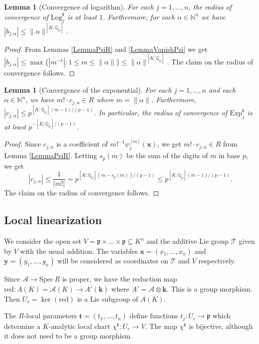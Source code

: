 \documentclass[11pt]{amsart}
\newtheorem{lemma}[theorem]{Lemma}
\theoremstyle{remark}
\numberwithin{equation}{section}
\newcommand{\pfrak}{\mathfrak{p}}
\newcommand{\Acal}{\mathscr{A}}
\newcommand{\Tcal}{\mathscr{T}}
\newcommand{\Q}{\mathbb{Q}}
\newcommand{\N}{\mathbb{N}}
\newcommand{\kk}{\mathbf{k}}
\newcommand{\xx}{\mathbf{x}}
\newcommand{\yy}{\mathbf{y}}
\newcommand{\ttt}{\mathbf{t}}
\newcommand{\Spec}{\mathrm{Spec}\,}
\newcommand{\Exp}{\mathrm{Exp}}
\newcommand{\red}{\mathrm{red}}
\newcommand{\Log}{\mathrm{Log}}
\begin{document}
\begin{lemma}[Convergence of  logarithm]\label{LemmaCvLog} For each $j=1,...,n$, the radius of convergence of $\Log^{\ttt}_j$ is at least $1$. Furthermore, for each $\alpha\in \N^n$ we have $|b_{j,\alpha}|\le \|\alpha\|^{[K:\Q_p]}$.
\end{lemma}
\begin{proof} From Lemmas \ref{LemmaPsiR} and \ref{LemmaVanishPsi} we get $|b_{j,\alpha}|\le \max\{ |m^{-1}|: 1\le m\le\|\alpha\|\} \le \|\alpha\|^{[K:\Q_p]}$. The claim on the radius of convergence follows.
\end{proof}


\begin{lemma}[Convergence of the exponential] \label{LemmaCvExp} For each $j=1,...,n$ and each $\alpha\in \N^n$, we have $m!\cdot c_{j,\alpha}\in R$ where $m=\|\alpha\|$. Furthermore, $|c_{j,\alpha}|\le p^{[K:\Q_p](m-1)/(p-1)}$. In particular, the radius of convergence of $\Exp^{\ttt}_j$ is at least $p^{-[K:\Q_p]/(p-1)}$.
\end{lemma}
\begin{proof} Since $c_{j,\alpha}$ is a coefficient of $m!^{-1} \psi_j^{[m]}(\xx)$, we get $m!\cdot c_{j,\alpha}\in R$ from Lemma \ref{LemmaPsiR}. Letting $s_p(m)$ be the sum of the digits of $m$ in base $p$, we get
$$
|c_{j,\alpha}|\le \frac{1}{|m!|} =p^{[K:\Q_p](m-s_p(m))/(p-1)}\le p^{[K:\Q_p](m-1)/(p-1)}.
$$
The claim on the radius of convergence follows.
\end{proof}

\subsection{Local linearization}\label{SecLocLin} We consider the open set $V = \pfrak\times ...\times \pfrak\subseteq K^n$ and the additive Lie group $\Tcal$ given by $V$ with the usual addition. The variables $\xx=(x_1,...,x_n)$ and $\yy=(y_1,...,y_n)$ will be considered as coordinates on $\Tcal$ and $V$ respectively.

Since $\Acal\to \Spec R$ is proper, we have the reduction map $\red : A(K)=\Acal(K)\to A'(\kk)$ where $A'=\Acal\otimes \kk$. This is a group morphism. Then $U_e=\ker(\red)$ is a Lie subgroup of $A(K)$. 

The $R$-local parameters $\ttt=(t_1,...,t_n)$ define functions $t_j:U_e\to \pfrak$ which determine a $K$-analytic local chart $\chi^\ttt:U_e\to V$. The map $\chi^\ttt$ is bijective, although it does not need to be a group morphism.
\end{document}
